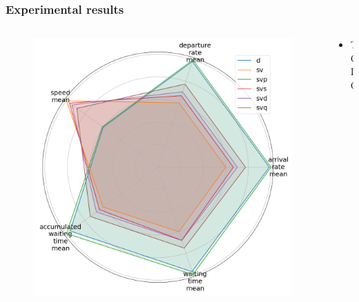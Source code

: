\documentclass[dvipsnames]{beamer}
\begin{document}
\begin{frame}
\frametitle{Experimental results}
  \begin{columns}
  \begin{column}{0.5\textwidth}
    \begin{figure}
      \centering
      \includegraphics[width=1.0\textwidth]{figures/obs-sharing-radar.png}
    \end{figure}
  \end{column}
  \begin{column}{0.5\textwidth}
    \begin{itemize}
      \item TODO
    \end{itemize}
  \end{column}
\end{columns}
\end{frame}
\end{document}
